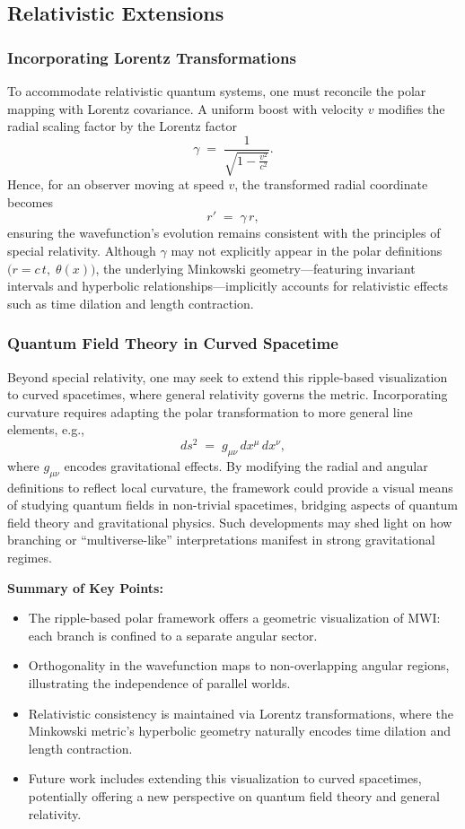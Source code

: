 \documentclass{article}
\begin{document}
\subsection{Relativistic Extensions}

\subsubsection{Incorporating Lorentz Transformations}

To accommodate relativistic quantum systems, one must reconcile the polar mapping with Lorentz covariance. A uniform boost with velocity \(v\) modifies the radial scaling factor by the Lorentz factor
\[
\gamma \;=\; \frac{1}{\sqrt{1 - \frac{v^2}{c^2}}}.
\]
Hence, for an observer moving at speed \(v\), the transformed radial coordinate becomes 
\[
r' \;=\; \gamma\,r,
\]
ensuring the wavefunction’s evolution remains consistent with the principles of special relativity. Although \(\gamma\) may not explicitly appear in the polar definitions \(\bigl(r=c\,t,\;\theta(x)\bigr)\), the underlying Minkowski geometry—featuring invariant intervals and hyperbolic relationships—implicitly accounts for relativistic effects such as time dilation and length contraction.

\subsubsection{Quantum Field Theory in Curved Spacetime}

Beyond special relativity, one may seek to extend this ripple-based visualization to curved spacetimes, where general relativity governs the metric. Incorporating curvature requires adapting the polar transformation to more general line elements, e.g., 
\[
ds^2 \;=\; g_{\mu\nu}\,dx^\mu\,dx^\nu,
\]
where \(g_{\mu\nu}\) encodes gravitational effects. By modifying the radial and angular definitions to reflect local curvature, the framework could provide a visual means of studying quantum fields in non-trivial spacetimes, bridging aspects of quantum field theory and gravitational physics. Such developments may shed light on how branching or “multiverse-like” interpretations manifest in strong gravitational regimes.

\vspace{1em}
\noindent
\textbf{Summary of Key Points:}
\begin{itemize}
    \item The ripple-based polar framework offers a geometric visualization of MWI: each branch is confined to a separate angular sector.
    \item Orthogonality in the wavefunction maps to non-overlapping angular regions, illustrating the independence of parallel worlds.
    \item Relativistic consistency is maintained via Lorentz transformations, where the Minkowski metric’s hyperbolic geometry naturally encodes time dilation and length contraction.
    \item Future work includes extending this visualization to curved spacetimes, potentially offering a new perspective on quantum field theory and general relativity.
\end{itemize}
\end{document}
